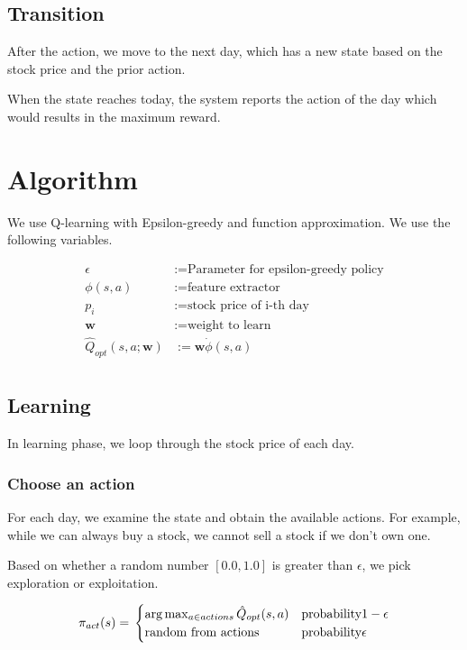 \documentclass[12pt]{article}
\newcommand{\vect}[1]{\boldsymbol{#1}}
\begin{document}
\subsection{Transition}

After the action, we move to the next day, which has a new state based
on the stock price and the prior action.

When the state reaches today, the system reports the action of the day
which would results in the maximum reward.

\section{Algorithm}

We use Q-learning with Epsilon-greedy and function approximation. We
use the following variables.

\begin{align*}
  \epsilon &:= \text{Parameter for epsilon-greedy policy} \\
  \phi(s,a) &:= \text{feature extractor} \\
  p_i &:= \text{stock price of i-th day} \\
  \vect{w} &:= \text{weight to learn} \\
  \hat{Q}_{opt}(s, a; \vect{w}) &:= \vect{w} \dot \phi(s, a) \\
\end{align*}

\subsection{Learning}

In learning phase, we loop through the stock price of each day.

\subsubsection*{Choose an action}

For each day, we examine the state and obtain the available
actions. For example, while we can always buy a stock, we cannot sell
a stock if we don't own one.

Based on whether a random number $[0.0, 1.0]$ is greater than
$\epsilon$, we pick exploration or exploitation.

\[
  \pi_{act}(s) = \\
  \begin{cases}
    \arg \max_{a \in actions}\hat{Q}_{opt}(s, a) & \text{probability} 1-\epsilon \\
    \text{random from actions} & \text{probability} \epsilon \\
  \end{cases}
\]
\end{document}
